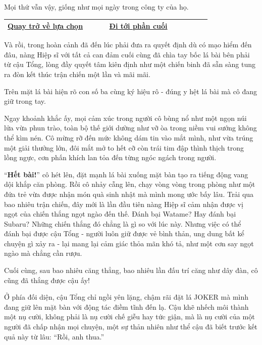 \documentclass[../main.tex]{subfiles}
\begin{document}
Mọi thứ vẫn vậy, giống như mọi ngày trong công ty của họ.

\begin{table}[H]
  \centering
  \setlength{\arrayrulewidth}{1pt}
  \begin{tabular}{|>{\centering\arraybackslash}p{0.4\linewidth}|>{\centering\arraybackslash}p{0.4\linewidth}|}
    \hline
    \hyperref[choice]{Quay trở về lựa chọn} & \hyperref[ending]{Đi tới phần cuối} \\ \hline
  \end{tabular}
\end{table}

\label{cardright}

Và rồi, trong hoàn cảnh đã đến lúc phải đưa ra quyết định dù có mạo hiểm đến đâu, nàng Hiệp sĩ với tất cả can đảm cuối cùng đã chìa tay bốc lá bài bên phải từ cậu Tổng, lòng đầy quyết tâm kiên định như một chiến binh đã sẵn sàng tung ra đòn kết thúc trận chiến một lần và mãi mãi.

Trên mặt lá bài hiện rõ con số ba cùng ký hiệu rô - đúng y hệt lá bài mà cô đang giữ trong tay.

Ngay khoảnh khắc ấy, mọi cảm xúc trong người cô bùng nổ như một ngọn núi lửa vừa phun trào, toàn bộ thế giới dường như vỡ òa trong niềm vui sướng không thể kìm nén. Cô mừng rỡ đến mức không dám tin vào mắt mình, như vừa trúng một giải thưởng lớn, đôi mắt mở to hết cỡ còn trái tim đập thình thịch trong lồng ngực, cơn phấn khích lan tỏa đến từng ngóc ngách trong người.

``\textbf{Hết bài!}'' cô hét lên, đặt mạnh lá bài xuống mặt bàn tạo ra tiếng động vang dội khắp căn phòng. Rồi cô nhảy cẫng lên, chạy vòng vòng trong phòng như một đứa trẻ vừa được nhận món quà sinh nhật mà mình mong ước bấy lâu. Trải qua bao nhiêu trận chiến, đây mới là lần đầu tiên nàng Hiệp sĩ cảm nhận được vị ngọt của chiến thắng ngọt ngào đến thế. Đánh bại Watame? Hay đánh bại Subaru? Những chiến thắng đó chẳng là gì so với lúc này. Nhưng việc có thể đánh bại được cậu Tổng - người luôn giữ được vẻ bình thản, ung dung bất kể chuyện gì xảy ra - lại mang lại cảm giác thỏa mãn khó tả, như một cơn say ngọt ngào mà chẳng cần rượu.

Cuối cùng, sau bao nhiêu căng thẳng, bao nhiêu lần đấu trí căng như dây đàn, cô cũng đã thắng được cậu ấy!

Ở phía đối diện, cậu Tổng chỉ ngồi yên lặng, chậm rãi đặt lá JOKER mà mình đang giữ lên mặt bàn với động tác điềm tĩnh đến lạ. Cậu khẽ nhếch môi thành một nụ cười, không phải là nụ cười chế giễu hay tức giận, mà là nụ cười của một người đã chấp nhận mọi chuyện, một sự thản nhiên như thể cậu đã biết trước kết quả này từ lâu: ``Rồi, anh thua.''
\end{document}
